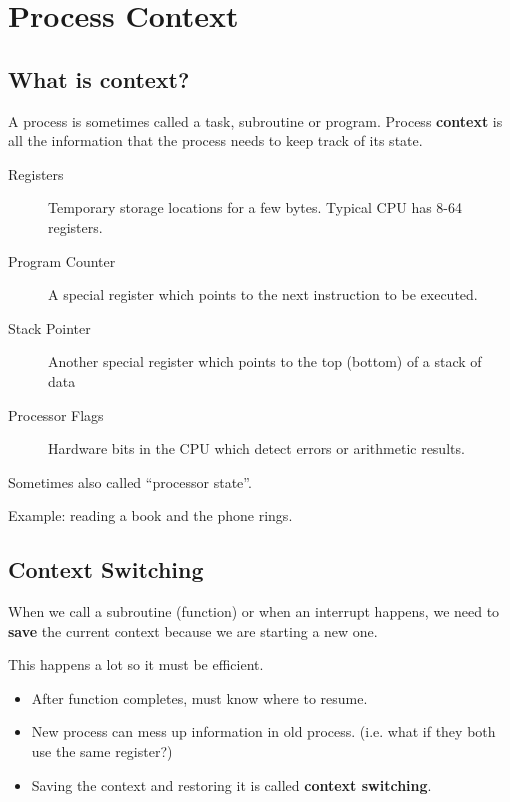 \documentclass{article}	%
\begin{document}

\section{Process Context}
\subsection{What is context?}
A process is sometimes called a task, subroutine or
program.  Process {\bf context} is all the information that
the process needs to keep track of its state.

\begin{description}
\item[Registers]   Temporary storage locations for a few
bytes.  Typical CPU has 8-64 registers.
\item[Program Counter] A special register which points to the
next instruction to be executed.
\item[Stack Pointer] Another special register which points to
the top (bottom) of a stack of data
\item[Processor Flags] Hardware bits in the CPU which detect
errors or arithmetic results.
\end{description}

Sometimes also called ``processor state''.

Example:  reading a book and the phone rings.


\subsection{Context Switching}

When we call a subroutine (function) or when an
interrupt happens, we need to {\bf save} the current context
because we are starting a new one.

This happens a lot so it must be efficient.


\begin{itemize}
         \item After function completes, must know where to resume.
         \item New process can mess up information in old process.
        (i.e. what if they both use the same register?)
        \item Saving the context and restoring it is called
        {\bf context switching}.
\end{itemize}
\end{document}
